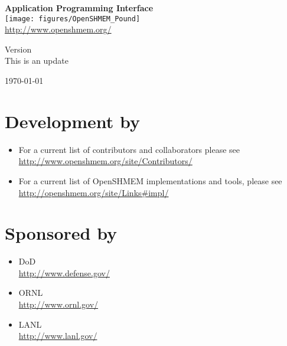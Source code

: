 \thispagestyle{empty}
\begin{center}
\textbf{\Huge \openshmem}
\par
\end{center}

\begin{center}
\textbf{\LARGE Application Programming Interface}\\
\texttt{[image: figures/OpenSHMEM\_Pound]}\\
\url{http://www.openshmem.org/}
\par
\end{center}

\begin{center}
Version \insertDocVersion \\ This is an update
\par
\end{center}

\vspace{0.5in}
\begin{center}
\today
\end{center}

\vspace{0.5in}

\vfill{}

\section*{Development by}
\begin{itemize}
\item For a current list of contributors and collaborators please see\\
  \url{http://www.openshmem.org/site/Contributors/}
\item For a current list of OpenSHMEM implementations and tools, please see\\
  \url{http://openshmem.org/site/Links#impl/}

\end{itemize}

\pagebreak{}

\section*{Sponsored by}
\begin{itemize}
\item \ac{DoD}\\
  \url{http://www.defense.gov/ }
\item \ac{ORNL}\\
  \url{http://www.ornl.gov/}
\item \ac{LANL}\\
  \url{http://www.lanl.gov/}
\end{itemize}

